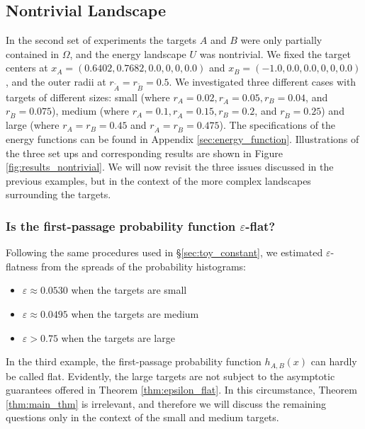 \documentclass[12pt, nofootinbib,english, amsmath, amssymb, aps, priprint, graphicx,floatfix]{revtex4-1}
\theoremstyle{plain}
\theoremstyle{definition}
\theoremstyle{plain}
\newcommand{\dA}{{\dot A}}
\newcommand{\tA}{{\tilde A}}
\newcommand{\dB}{{\dot B}}
\newcommand{\tB}{{\tilde B}}
\begin{document}
{\subsection{Nontrivial Landscape}\label{sec:nontrivial_results}
In the second set of experiments the targets $A$ and $B$ were only partially contained in $\Omega$, and the energy landscape $U$ was nontrivial.  We fixed the target centers at $x_A=(0.6402,0.7682,0.0,0,0,0.0)$ and  $x_B=(-1.0,0.0,0.0,0,0,0.0)$, and the outer radii at $r_\tA=r_\tB=0.5$.  We investigated three different cases with targets of different sizes: small (where $r_A=0.02, r_\dA=0.05, r_B=0.04$, and $r_\dB=0.075$), medium (where $r_A=0.1, r_\dA=0.15, r_B=0.2$, and $r_\dB=0.25$) and large (where $r_A=r_B=0.45$ and $r_\dA=r_\dB=0.475$). The  
specifications of the energy functions can be found in Appendix \ref{sec:energy_function}. Illustrations of the three set ups and corresponding results are shown in Figure \ref{fig:results_nontrivial}.  We will now revisit the three issues discussed in the previous examples, but in the context of the more complex landscapes surrounding the targets.

\subsubsection{Is the first-passage probability function 
 $\varepsilon$-flat?}
 \label{sec:nontrivial_flat}
 Following the same procedures used in \S\ref{sec:toy_constant}, we estimated $\varepsilon$-flatness 
from the spreads of the probability histograms: 
\begin{itemize}
    \item $\varepsilon\approx 0.0530$ when the targets are small
    \item $\varepsilon\approx 0.0495$ when the targets are medium
    \item $\varepsilon> 0.75$ when the targets are large
\end{itemize}
In the third example,
the first-passage probability function $h_{A,B}(x)$ can hardly be called flat.
Evidently, the large targets are not subject to the asymptotic guarantees offered in Theorem \ref{thm:epsilon_flat}.
In this circumstance, Theorem \ref{thm:main_thm} is irrelevant, and therefore we will discuss the remaining questions only in the context of the small and medium targets.


}
\end{document}
